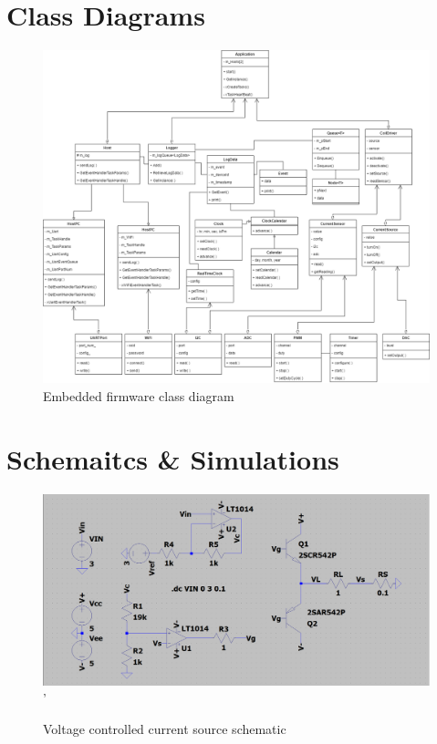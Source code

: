 \documentclass[10pt,twocolumn,letterpaper]{article}
\begin{document}


\onecolumn

\appendix
\appendixpage

\section{Class Diagrams} \label{app:class-diagrams}

\begin{figure}[htb]
  \centering
  \includegraphics[width=\linewidth, keepaspectratio]{figures/emb-class-diagram.png}
  \caption{Embedded firmware class diagram}
  \label{fig:emb-class-diagram}
\end{figure}

\newpage
\section{Schemaitcs \& Simulations} \label{app:schematics}

\begin{figure}[htb]
  \centering
  \includegraphics[width=\linewidth, keepaspectratio]{figures/current-source-schematic.png}'
  \caption{Voltage controlled current source schematic}
  \label{fig:schm-current-source}
\end{figure}
\end{document}
